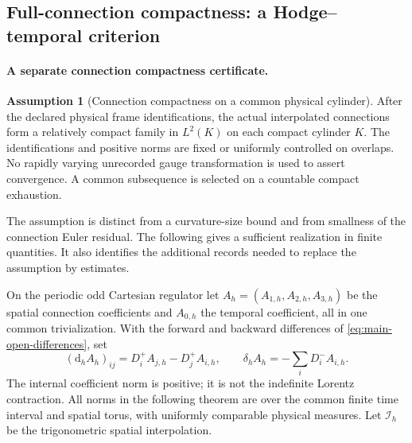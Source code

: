 \documentclass[11pt]{article}
\numberwithin{equation}{section}
\theoremstyle{definition}
\newtheorem{assumption}[assumption]{Assumption}
\theoremstyle{remark}
\newcommand{\dd}{\mathrm d}
\begin{document}
\subsection{Full-connection compactness: a Hodge--temporal criterion}

\paragraph{A separate connection compactness certificate.}
\begin{assumption}[Connection compactness on a common physical cylinder]
\label{ass:main-connection-compactness}
After the declared physical frame identifications, the actual interpolated
connections form a relatively compact family in $L^2(K)$ on each compact
cylinder $K$. The identifications and positive norms are fixed or uniformly
controlled on overlaps. No rapidly varying unrecorded gauge transformation
is used to assert convergence. A common subsequence is selected on a
countable compact exhaustion.
\end{assumption}

The assumption is distinct from a curvature-size bound and from smallness
of the connection Euler residual. The following gives a sufficient
realization in finite quantities. It also identifies the additional records
needed to replace the assumption by estimates.

On the periodic odd Cartesian regulator let $A_h=(A_{1,h},A_{2,h},A_{3,h})$
be the spatial connection coefficients and $A_{0,h}$ the temporal
coefficient, all in one common trivialization. With the forward and backward
differences of \eqref{eq:main-open-differences}, set
\begin{equation}
 (\dd_h A_h)_{ij}=D_i^+A_{j,h}-D_j^+A_{i,h},\qquad
 \delta_h A_h=-\sum_iD_i^-A_{i,h}.
 \label{eq:main-connection-hodge}
\end{equation}
The internal coefficient norm is positive; it is not the indefinite
Lorentz contraction. All norms in the following theorem are over the common
finite time interval and spatial torus, with uniformly comparable physical
measures. Let $\mathcal I_h$ be the trigonometric spatial interpolation.
\end{document}
